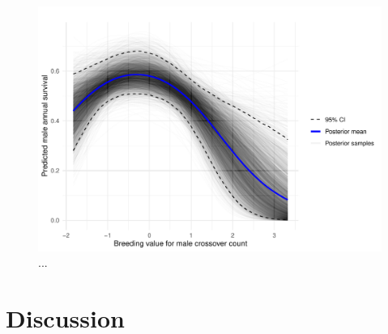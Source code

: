 \documentclass[dvipsnames]{article}
\begin{document}
\begin{figure}
    \centering
    \includegraphics[width=0.91\linewidth]{figs/surv_bv_pred_m.pdf}
    \caption{...}
    \label{fig-surv_bv_m}
\end{figure}

\section*{Discussion}

\clearpage


\clearpage
\end{document}
